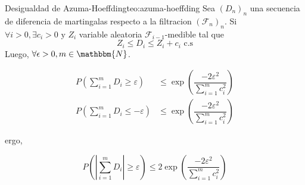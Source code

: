 \begin{theorem}{Desigualdad de Azuma-Hoeffding}{teo:azuma-hoeffding}
    Sea \((D_n)_n\) una secuencia de diferencia de martingalas respecto a la filtracion \((\mathcal{F}_n)_n\). Si \(\forall i>0, \exists c_i >0 \text{ y } Z_i\) variable aleatoria \(\mathcal{F}_{i-1}\)-medible tal que
    \[
        Z_i \leq D_i \leq Z_i + c_i \text{ c.s}
    \]
    Luego, \(\forall \epsilon>0, m \in \mathbbm{N}\).

    \begin{align}
        P\left(\sum^m_{i=1} D_i \geq \varepsilon\right) &\leq \operatorname{exp}\left(\dfrac{-2\varepsilon^2}{\sum^m_{i=1}c_i^2}\right) \\
        P\left(\sum^m_{i=1} D_i \leq -\varepsilon\right) &\leq \operatorname{exp}\left(\dfrac{-2\varepsilon^2}{\sum^m_{i=1}c_i^2}\right)
    \end{align}

    ergo,

    \begin{equation}
        P\left(\left|\sum^m_{i=1} D_i\right| \geq \varepsilon\right) \leq 2\operatorname{exp}\left(\dfrac{-2\varepsilon^2}{\sum^m_{i=1}c_i^2}\right)
    \end{equation}
\end{theorem}

